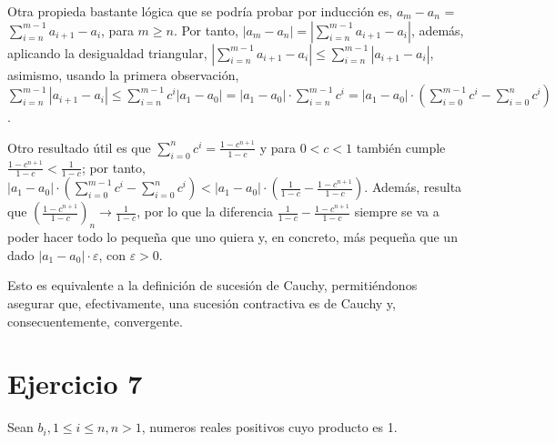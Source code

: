 \documentclass{article}
\begin{document}
Otra propieda bastante lógica que se podría probar por inducción es, $a_m - a_n$ = $\sum_{i = n}^{m - 1} a_{i + 1} - a_i$, para $m \geq n$. Por tanto, $|a_m - a_n| = |\sum_{i = n}^{m - 1} a_{i + 1} - a_i|$, además, aplicando la desigualdad triangular, $|\sum_{i = n}^{m - 1} a_{i + 1} - a_i| \leq \sum_{i = n}^{m - 1} |a_{i + 1} - a_i|$, asimismo, usando la primera observación, $\sum_{i = n}^{m - 1} |a_{i + 1} - a_i| \leq \sum_{i = n}^{m - 1} c^{i}|a_1 - a_0| = |a_1 - a_0|·\sum_{i = n}^{m - 1} c^{i} = |a_1 - a_0|·(\sum_{i = 0}^{m - 1} c^{i} - \sum_{i = 0}^{n} c^{i})$.

Otro resultado útil es que $\sum_{i = 0}^{n} c^{i} = \frac{1 - c^{n + 1}}{1 - c}$ y para $0 < c < 1$ también cumple $\frac{1 - c^{n + 1}}{1 - c} < \frac{1}{1 - c}$; por tanto, $|a_1 - a_0|·(\sum_{i = 0}^{m - 1} c^{i} - \sum_{i = 0}^{n} c^{i}) < |a_1 - a_0|·(\frac{1}{1 - c} - \frac{1 - c^{n + 1}}{1 - c})$. Además, resulta que $(\frac{1 - c^{n + 1}}{1 - c})_n \longrightarrow \frac{1}{1 - c}$, por lo que la diferencia $\frac{1}{1 - c} - \frac{1 - c^{n + 1}}{1 - c}$ siempre se va a poder hacer todo lo pequeña que uno quiera y, en concreto, más pequeña que un dado $|a_1 - a_0|·\varepsilon$, con $\varepsilon > 0$. 

Esto es equivalente a la definición de sucesión de Cauchy, permitiéndonos asegurar que, efectivamente, una sucesión contractiva es de Cauchy y, consecuentemente, convergente.

\newpage

\section{Ejercicio 7}

Sean $b_i, 1 \leq i \leq n, n > 1$, numeros reales positivos cuyo producto es 1.
\end{document}
